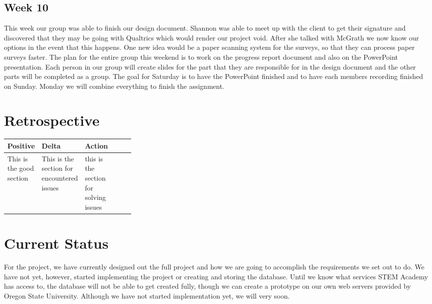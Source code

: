 \documentclass[letterpaper,10pt,serif, draftclsnofoot,onecolumn, compsoc, titlepage]{IEEEtran}
\begin{document}
\subsection{Week 10}
This week our group was able to finish our design document. Shannon was able to meet up with the client to get their signature and discovered that they may be going with Qualtrics which would render our project void. After she talked with McGrath we now know our options in the event that this happens. One new idea would be a paper scanning system for the surveys, so that they can process paper surveys faster. The plan for the entire group this weekend is to work on the progress report document and also on the PowerPoint presentation. Each person in our group will create slides for the part that they are responsible for in the design document and the other parts will be completed as a group. The goal for Saturday is to have the PowerPoint finished and to have each members recording finished on Sunday. Monday we will combine everything to finish the assignment. 

\section{Retrospective}
\begin{center}
    \begin{tabular}{ | l | l | l | p{0.3\linewidth} |}
    \hline
     Positive & Delta & Action \\ \hline
  	This is the good section & This is the section for encountered issues & this is the section for solving issues \\ \hline
    \end{tabular}
\end{center}

\section{Current Status}
For the project, we have currently designed out the full project and how we are going to accomplish the requirements we set out to do.
We have not yet, however, started implementing the project or creating and storing the database.
Until we know what services STEM Academy has access to, the database will not be able to get created fully, though we can create a prototype on our own web servers provided by Oregon State University.
Although we have not started implementation yet, we will very soon.
\end{document}
